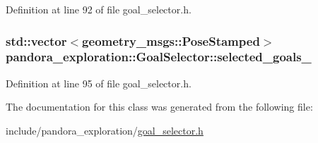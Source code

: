 \-Definition at line 92 of file goal\-\_\-selector.\-h.

\hypertarget{classpandora__exploration_1_1_goal_selector_aebc56a4f3b399e0e72c0de5e1ab58187}{
\subsubsection[{selected\-\_\-goals\-\_\-}]{\setlength{\rightskip}{0pt plus 5cm}std\-::vector$<$geometry\-\_\-msgs\-::\-Pose\-Stamped$>$ {\bf pandora\-\_\-exploration\-::\-Goal\-Selector\-::selected\-\_\-goals\-\_\-}}}\label{classpandora__exploration_1_1_goal_selector_aebc56a4f3b399e0e72c0de5e1ab58187}


\-Definition at line 95 of file goal\-\_\-selector.\-h.



\-The documentation for this class was generated from the following file\-:\begin{DoxyCompactItemize}
\item 
include/pandora\-\_\-exploration/\hyperlink{goal__selector_8h}{goal\-\_\-selector.\-h}\end{DoxyCompactItemize}
